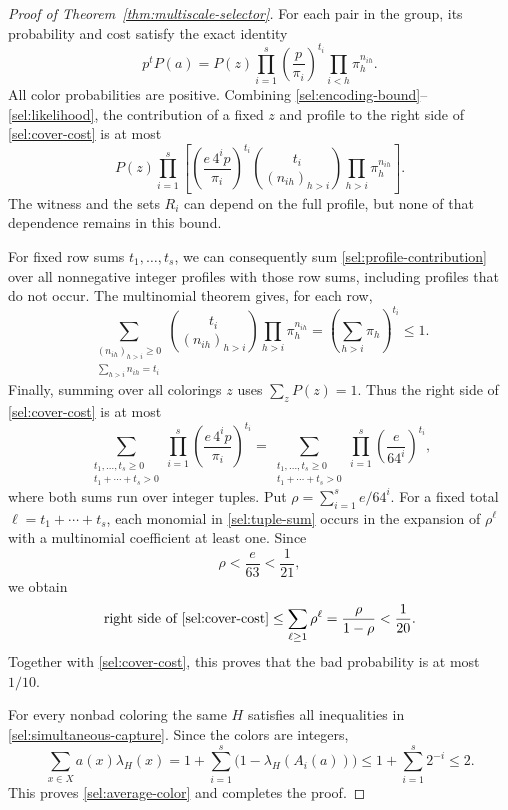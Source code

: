 \begin{proof}[Proof of Theorem~\ref{thm:multiscale-selector}]
For each pair in the group, its probability and cost satisfy the
exact identity
\begin{equation}
\label{sel:likelihood}
  p^tP(a)=P(z)
      \prod_{i=1}^s\left(\frac p{\pi_i}\right)^{t_i}
      \prod_{i<h}\pi_h^{n_{ih}}.
\end{equation}
All color probabilities are positive.  Combining
\eqref{sel:encoding-bound}--\eqref{sel:likelihood}, the contribution
of a fixed $z$ and profile to the right side of
\eqref{sel:cover-cost} is at most
\begin{equation}
\label{sel:profile-contribution}
  P(z)\prod_{i=1}^s
  \left[
     \left(\frac{e\,4^i p}{\pi_i}\right)^{t_i}
     \binom{t_i}{(n_{ih})_{h>i}}
     \prod_{h>i}\pi_h^{n_{ih}}
  \right].
\end{equation}
The witness and the sets $R_i$ can depend on the full profile, but
none of that dependence remains in this bound.

For fixed row sums $t_1,\ldots,t_s$, we can consequently sum
\eqref{sel:profile-contribution} over all nonnegative integer
profiles with those row sums, including profiles that do not
occur.  The multinomial theorem gives, for each row,
\[
  \sum_{\substack{(n_{ih})_{h>i}\ge0\\
                   \sum_{h>i}n_{ih}=t_i}}
      \binom{t_i}{(n_{ih})_{h>i}}
      \prod_{h>i}\pi_h^{n_{ih}}
  =\left(\sum_{h>i}\pi_h\right)^{t_i}\le1.
\]
Finally, summing over all colorings $z$ uses $\sum_zP(z)=1$.
Thus the right side of \eqref{sel:cover-cost} is at most
\begin{equation}
\label{sel:tuple-sum}
  \sum_{\substack{t_1,\ldots,t_s\ge0\\
                   t_1+\cdots+t_s>0}}
       \prod_{i=1}^s
         \left(\frac{e\,4^i p}{\pi_i}\right)^{t_i}
  =
  \sum_{\substack{t_1,\ldots,t_s\ge0\\
                   t_1+\cdots+t_s>0}}
       \prod_{i=1}^s\left(\frac e{64^i}\right)^{t_i},
\end{equation}
where both sums run over integer tuples.
Put $\rho=\sum_{i=1}^s e/64^i$.  For a fixed total
$\ell=t_1+\cdots+t_s$, each monomial in
\eqref{sel:tuple-sum} occurs in the expansion of $\rho^\ell$ with
a multinomial coefficient at least one.  Since
\[
  \rho<\frac e{63}<\frac1{21},
\]
we obtain
\[
  \text{right side of \eqref{sel:cover-cost}}
  \le\sum_{\ell\ge1}\rho^\ell
  =\frac{\rho}{1-\rho}<\frac1{20}.
\]
Together with \eqref{sel:cover-cost}, this proves that the bad
probability is at most $1/10$.

For every nonbad coloring the same $H$ satisfies all inequalities
in \eqref{sel:simultaneous-capture}.  Since the colors are integers,
\[
  \sum_{x\in X}a(x)\lambda_H(x)
  =1+\sum_{i=1}^s\bigl(1-\lambda_H(A_i(a))\bigr)
  \le1+\sum_{i=1}^s2^{-i}\le2.
\]
This proves \eqref{sel:average-color} and completes the proof.
\end{proof}
